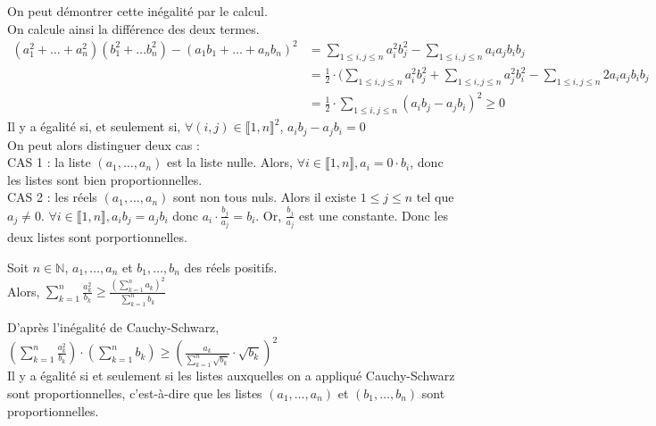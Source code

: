 \begin{preuve} On peut démontrer cette inégalité par le calcul. \\ On calcule ainsi la différence des deux termes.
\begin{align*}
(a_1^2+\dots + a_n^2)(b_1^2+ \dots b_n^2)-(a_1b_1 + \dots + a_nb_n)^2 &= \sum_{1\leqslant i, j \leqslant n} a_i^2b_j^2 - \sum_{1 \leqslant i, j \leqslant n} a_ia_jb_ib_j \\
&= \frac{1}{2} \cdot (\sum_{1\leqslant i, j \leqslant n} a_i^2b_j^2 + \sum_{1\leqslant i, j \leqslant n} a_j^2b_i^2 - \sum_{1 \leqslant i, j \leqslant n} 2a_ia_jb_ib_j \\
&= \frac{1}{2} \cdot \sum_{1\leqslant i, j \leqslant n} (a_ib_j-a_jb_i)^2 \geqslant 0
\end{align*}
Il y a égalité si, et seulement si, $\forall (i, j) \in \llbracket 1, n \rrbracket ^2$, $a_ib_j-a_jb_i = 0$\\ On peut alors distinguer deux cas : \\
CAS 1 : la liste $(a_1, \dots, a_n)$ est la liste nulle. Alors, $\forall i \in \llbracket 1, n \rrbracket, a_i = 0 \cdot b_i$, donc les listes sont bien proportionnelles. \\
CAS 2 : les réels $(a_1, \dots, a_n)$ sont non tous nuls. Alors il existe $ 1 \leqslant j \leqslant n$ tel que $a_j \neq 0$. $\forall i \in \llbracket 1, n \rrbracket, a_ib_j = a_jb_i$ donc $a_i \cdot \frac{b_j}{a_j} = b_i$. Or, $\frac{b_j}{a_j}$ est une constante. Donc les deux listes sont porportionnelles.

\end{preuve}

\begin{pro} Soit $n\in\mathbb{N}$, $a_1, \dots, a_n$ et $b_1, \dots, b_n$ des réels positifs.\\ Alors, $\sum_{k=1}^n\frac{a_k^2}{b_k} \geqslant \frac{(\sum_{k=1}^na_k)^2}{\sum_{k=1}^n b_k}$
\end{pro}

\begin{preuve} D'après l'inégalité de Cauchy-Schwarz, $(\sum_{k=1}^n\frac{a_k^2}{b_k})\cdot (\sum_{k=1}^nb_k) \geqslant (\frac{a_k}{\sum_{k=1}^n\sqrt{b_k}}\cdot \sqrt{b_k})^2$ \\ Il y a égalité si et seulement si les listes auxquelles on a appliqué Cauchy-Schwarz sont proportionnelles, c'est-à-dire que les listes $(a_1, \dots, a_n)$ et $(b_1, \dots, b_n)$ sont proportionnelles.

\end{preuve}

